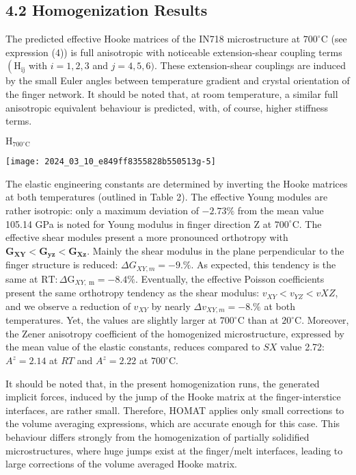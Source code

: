 \documentclass[10pt]{article}
\begin{document}
\subsection*{4.2 Homogenization Results}
The predicted effective Hooke matrices of the IN718 microstructure at $700^{\circ} \mathrm{C}$ (see expression (4)) is full anisotropic with noticeable extension-shear coupling terms $\left(\mathrm{H}_{\mathrm{ij}}\right.$ with $i=1,2,3$ and $j=4,5,6)$. These extension-shear couplings are induced by the small Euler angles between temperature gradient and crystal orientation of the finger network. It should be noted that, at room temperature, a similar full anisotropic equivalent behaviour is predicted, with, of course, higher stiffness terms.

$\mathrm{H}_{700^{\circ} \mathrm{C}}$

\begin{center}
\texttt{[image: 2024\_03\_10\_e849ff8355828b550513g-5]}
\end{center}

The elastic engineering constants are determined by inverting the Hooke matrices at both temperatures (outlined in Table 2). The effective Young modules are rather isotropic: only a maximum deviation of $-2.73 \%$ from the mean value 105.14 GPa is noted for Young modulus in finger direction $\mathrm{Z}$ at $700^{\circ} \mathrm{C}$. The effective shear modules present a more pronounced orthotropy with $\mathbf{G}_{\mathbf{X Y}}<\mathbf{G}_{\mathbf{y z}}<\mathbf{G}_{\mathbf{X z}}$. Mainly the shear modulus in the plane perpendicular to the finger structure is reduced: $\Delta G_{X Y, m}=-9 . \%$. As expected, this tendency is the same at $\mathrm{RT}: \Delta \mathrm{G}_{X Y, \mathrm{~m}}=-8.4 \%$. Eventually, the effective Poisson coefficients present the same orthotropy tendency as the shear modulus: $v_{X Y}<v_{Y Z}<v X Z$, and we observe a reduction of $v_{X Y}$ by nearly $\Delta v_{X Y, m}=-8 . \%$ at both temperatures. Yet, the values are slightly larger at $700^{\circ} \mathrm{C}$ than at $20^{\circ} \mathrm{C}$. Moreover, the Zener anisotropy coefficient of the homogenized microstructure, expressed by the mean value of the elastic constants, reduces compared to $S X$ value 2.72: $A^{z}=2.14$ at $R T$ and $A^{z}=2.22$ at $700^{\circ} \mathrm{C}$.

It should be noted that, in the present homogenization runs, the generated implicit forces, induced by the jump of the Hooke matrix at the finger-interstice interfaces, are rather small. Therefore, HOMAT applies only small corrections to the volume averaging expressions, which are accurate enough for this case. This behaviour differs strongly from the homogenization of partially solidified microstructures, where huge jumps exist at the finger/melt interfaces, leading to large corrections of the volume averaged Hooke matrix.
\end{document}
